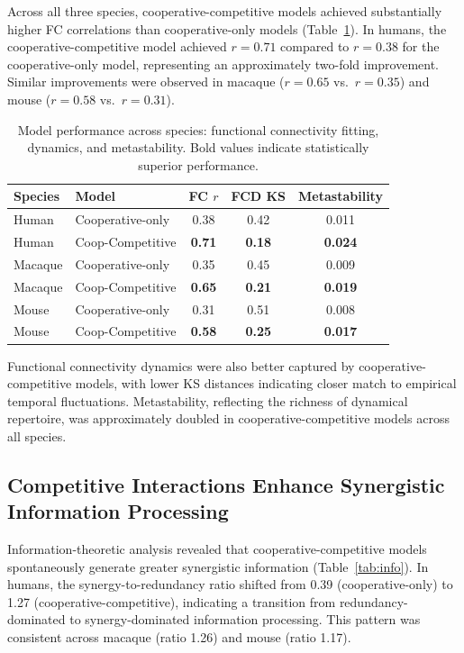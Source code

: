 \documentclass[11pt]{article}
\begin{document}
Across all three species, cooperative-competitive models achieved substantially higher FC correlations than cooperative-only models (Table~\ref{tab:fc}). In humans, the cooperative-competitive model achieved $r = 0.71$ compared to $r = 0.38$ for the cooperative-only model, representing an approximately two-fold improvement. Similar improvements were observed in macaque ($r = 0.65$ vs.\ $r = 0.35$) and mouse ($r = 0.58$ vs.\ $r = 0.31$).

\begin{table}[ht]
\centering
\caption{Model performance across species: functional connectivity fitting, dynamics, and metastability. Bold values indicate statistically superior performance.}
\label{tab:fc}
\begin{tabular}{@{}llccc@{}}
\toprule
Species & Model & FC $r$ & FCD KS & Metastability \\
\midrule
Human & Cooperative-only & 0.38 & 0.42 & 0.011 \\
Human & Coop-Competitive & \textbf{0.71} & \textbf{0.18} & \textbf{0.024} \\
Macaque & Cooperative-only & 0.35 & 0.45 & 0.009 \\
Macaque & Coop-Competitive & \textbf{0.65} & \textbf{0.21} & \textbf{0.019} \\
Mouse & Cooperative-only & 0.31 & 0.51 & 0.008 \\
Mouse & Coop-Competitive & \textbf{0.58} & \textbf{0.25} & \textbf{0.017} \\
\bottomrule
\end{tabular}
\end{table}

Functional connectivity dynamics were also better captured by cooperative-competitive models, with lower KS distances indicating closer match to empirical temporal fluctuations. Metastability, reflecting the richness of dynamical repertoire, was approximately doubled in cooperative-competitive models across all species.

\subsection{Competitive Interactions Enhance Synergistic Information Processing}

Information-theoretic analysis revealed that cooperative-competitive models spontaneously generate greater synergistic information (Table~\ref{tab:info}). In humans, the synergy-to-redundancy ratio shifted from 0.39 (cooperative-only) to 1.27 (cooperative-competitive), indicating a transition from redundancy-dominated to synergy-dominated information processing. This pattern was consistent across macaque (ratio 1.26) and mouse (ratio 1.17).
\end{document}
